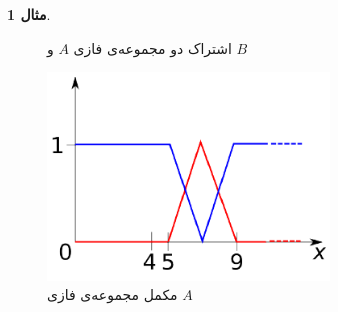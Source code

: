 \documentclass[12pt,a4paper]{article}
\theoremstyle{definition}
\newtheorem{exmp}{مثال}[section]
\begin{document}
\begin{exmp}
\begin{figure}[h]
	\vspace{-0.5cm}
	\caption{اشتراک دو مجموعه‌ی فازی $ A $ و $ B $} \label{fig:f_fset_op_exmp_intersect}
\end{figure}
\begin{figure}[h]
	\centering 
	\includegraphics[width=75mm]{Images/Fig11.png}
	\vspace{-0.5cm}
	\caption{مکمل مجموعه‌ی فازی $A$} \label{fig:f_fset_op_exmp_complement}
\end{figure}\cite{Spada}\\
\end{exmp}
\end{document}
